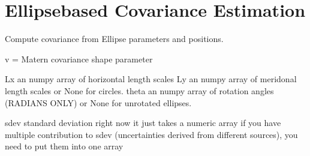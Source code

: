 \documentclass[letterpaper,10pt,english]{sphinxmanual}
\begin{document}
\section{Ellipse\sphinxhyphen{}based Covariance Estimation}
\label{\detokenize{ellipse:ellipse-based-covariance-estimation}}

\begin{fulllineitems}
\label{\detokenize{ellipse:glomar_gridding.ellipse.EllipseCovarianceBuilder}}
\pysigstartsignatures
\pysiglinewithargsret
{}
{\sphinxparamcomma {}\sphinxparamcomma {}\sphinxparamcomma {}\sphinxparamcomma {}\sphinxparamcomma {}\sphinxparamcomma {}\sphinxparamcomma {}\sphinxparamcomma {}\sphinxparamcomma {}\sphinxparamcomma {}\sphinxparamcomma {}}
{}
\pysigstopsignatures
\sphinxAtStartPar
Compute covariance from Ellipse parameters and positions.

\sphinxAtStartPar
v = Matern covariance shape parameter

\sphinxAtStartPar
Lx \sphinxhyphen{} an numpy array of horizontal length scales
Ly \sphinxhyphen{} an numpy array of meridonal length scales or None for circles.
theta \sphinxhyphen{} an numpy array of rotation angles (RADIANS ONLY) or None for
unrotated ellipses.

\sphinxAtStartPar
sdev \sphinxhyphen{} standard deviation \textendash{} right now it just takes a numeric array
if you have multiple contribution to sdev (uncertainties derived from
different sources), you need to put them into one array


\end{fulllineitems}
\end{document}
